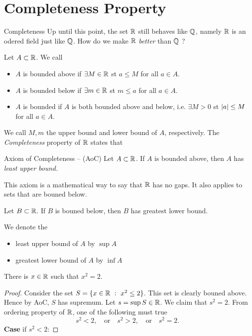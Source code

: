 \documentclass{beamer}
\begin{document}
\section{Completeness Property}
\begin{frame}{Completeness}
  Up until this point, the set $\R$ still behaves like $\Q$,
  namely $\R$ is an odered field just like $\Q$. How do we make
  $\R$ \emph{better} than $\Q$ ?

  \begin{definition}
    Let $A\subset\R$. We call
    \begin{itemize}
      \item $A$ is bounded above if $\exists M\in\R$ st $a\leq M$ for all $a\in A$.
      \item $A$ is bounded below if $\exists m\in\R$ st $m\leq a$ for all $a\in A$.
      \item $A$ is bounded if $A$ is both bounded above and below, i.e.
        $\exists M>0$ st $\lvert a\rvert\leq M$ for all $a\in A$.
    \end{itemize}
  \end{definition}

  We call $M,m$ the upper bound and lower bound 
  of $A$, respectively.
  The \emph{Completeness} property of $\R$ states that
\end{frame}
\begin{frame}[b]
  \begin{block}{Axiom of Completeness -- (AoC)}
    Let $A\subset\R$. If $A$ is bounded above, 
    then $A$ has \emph{least upper bound.}
  \end{block}
  This axiom is a mathematical way to say that $\R$ has no gaps.
  It also applies to sets that are bouned below.

  \begin{corollary}
    Let $B\subset\R$. If $B$ is bouned below, 
    then $B$ has greatest lower bound.
  \end{corollary}

  We denote the 
  \begin{itemize}
    \item least upper bound of $A$ by $\sup A$ 
    \item greatest lower bound of $A$ by $\inf A$
  \end{itemize}
  
\end{frame}
\begin{frame}{}
  \begin{lemma}
    There is $x\in\R$ such that $x^2=2$.
  \end{lemma}
  \begin{proof}
    Consider the set $S=\{x\in\R~:~ x^2\leq 2\}$. This set is clearly
    bouned above. Hence by AoC, $S$ has supremum. Let $s=\sup S\in\R$.
    We claim that $s^2=2$. From ordering property of $\R$, one of the
    following must true
    \[s^2<2, \quad\text{or}\quad s^2>2, \quad\text{or}\quad s^2=2.\]
    \textbf{Case } if $s^2<2$:
  \end{proof}
\end{frame}
\end{document}
